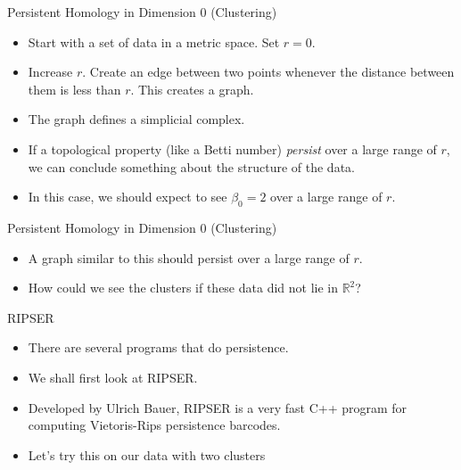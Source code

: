 \begin{frame}{Persistent Homology in Dimension 0 (Clustering)}
\begin{center}
\begin{itemize}
\item<1-> Start with a set of data in a metric space. Set $r=0$.
\item<2-> Increase $r$. Create an edge between two points whenever the distance between them is less than $r$. This creates a graph.
\item<3-> The graph defines a simplicial complex.
\item<4-> If a topological property (like a Betti number) \textit{persist} over a large range of $r$, we can conclude something about the structure of the data.
\item<4-> In this case, we should expect to see $\beta_0=2$ over a large range of $r$. 
\end{itemize}
\end{center}
\end{frame}
\begin{frame}{Persistent Homology in Dimension 0 (Clustering)}
\begin{center}
\end{center}
\begin{itemize}
\item<1-> A graph similar to this should persist over a large range of $r$.
\item<2-> How could we see the clusters if these data did not lie in $\mathbb{R}^2$?
\end{itemize}
\end{frame}
\begin{frame}{RIPSER}
\begin{itemize}
\item<1-> There are several programs that do persistence.
\item<2-> We shall first look at RIPSER\cite{bauer2017ripser}.
\item<3-> Developed by Ulrich Bauer, RIPSER is a very fast C++ program for computing Vietoris-Rips persistence barcodes.
\item<4-> Let's try this on our data with two clusters
\end{itemize}
\end{frame}
